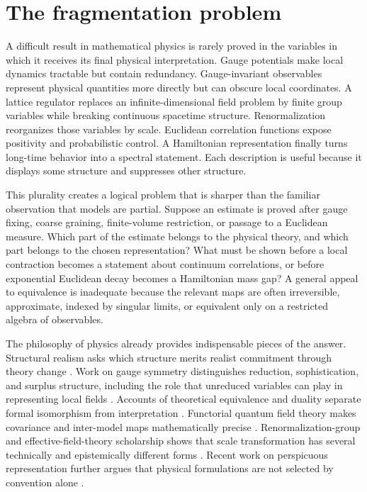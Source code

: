 \section{The fragmentation problem}
\label{sec:introduction}

A difficult result in mathematical physics is rarely proved in the variables
in which it receives its final physical interpretation.  Gauge potentials
make local dynamics tractable but contain redundancy.  Gauge-invariant
observables represent physical quantities more directly but can obscure local
coordinates.  A lattice regulator replaces an infinite-dimensional field
problem by finite group variables while breaking continuous spacetime
structure.  Renormalization reorganizes those variables by scale.  Euclidean
correlation functions expose positivity and probabilistic control.  A
Hamiltonian representation finally turns long-time behavior into a spectral
statement.  Each description is useful because it displays some structure
and suppresses other structure.

This plurality creates a logical problem that is sharper than the familiar
observation that models are partial.  Suppose an estimate is proved after
gauge fixing, coarse graining, finite-volume restriction, or passage to a
Euclidean measure.  Which part of the estimate belongs to the physical theory,
and which part belongs to the chosen representation?  What must be shown
before a local contraction becomes a statement about continuum
correlations, or before exponential Euclidean decay becomes a Hamiltonian
mass gap?  A general appeal to equivalence is inadequate because the relevant
maps are often irreversible, approximate, indexed by singular limits, or
equivalent only on a restricted algebra of observables.

The philosophy of physics already provides indispensable pieces of the
answer.  Structural realism asks which structure merits realist commitment
through theory change \cite{Worrall1989,VanFraassen2006,Roberts2011}.
Work on gauge symmetry distinguishes reduction, sophistication, and surplus
structure, including the role that unreduced variables can play in
representing local fields \cite{Belot2003,Dewar2019,NguyenTehWells2020}.
Accounts of theoretical equivalence and duality separate formal isomorphism
from interpretation \cite{Coffey2014,Lupher2018,DeHaroButterfield2018}.
Functorial quantum field theory makes covariance and inter-model maps
mathematically precise \cite{BrunettiFredenhagenVerch2003,Fewster2015}.
Renormalization-group and effective-field-theory scholarship shows that scale
transformation has several technically and epistemically different forms
\cite{WilsonKogut1974,Butterfield2011,Rivat2021,KoberinskiFraser2023}.
Recent work on perspicuous representation further argues that physical
formulations are not selected by convention alone \cite{North2026}.

